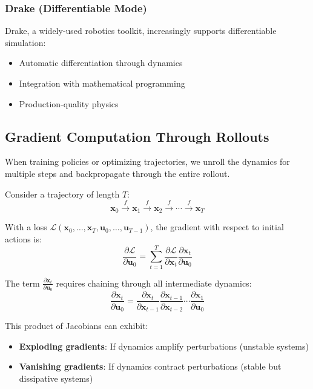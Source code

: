 \subsubsection{Drake (Differentiable Mode)}

Drake, a widely-used robotics toolkit, increasingly supports differentiable simulation:
\begin{itemize}
    \item Automatic differentiation through dynamics
    \item Integration with mathematical programming
    \item Production-quality physics
\end{itemize}

\subsection{Gradient Computation Through Rollouts}

When training policies or optimizing trajectories, we unroll the dynamics for multiple steps and backpropagate through the entire rollout.

Consider a trajectory of length $T$:
\begin{equation}
\mathbf{x}_0 \xrightarrow{f} \mathbf{x}_1 \xrightarrow{f} \mathbf{x}_2 \xrightarrow{f} \cdots \xrightarrow{f} \mathbf{x}_T
\end{equation}

With a loss $\mathcal{L}(\mathbf{x}_0, \ldots, \mathbf{x}_T, \mathbf{u}_0, \ldots, \mathbf{u}_{T-1})$, the gradient with respect to initial actions is:
\begin{equation}
\frac{\partial \mathcal{L}}{\partial \mathbf{u}_0} = \sum_{t=1}^{T} \frac{\partial \mathcal{L}}{\partial \mathbf{x}_t} \frac{\partial \mathbf{x}_t}{\partial \mathbf{u}_0}
\end{equation}

The term $\frac{\partial \mathbf{x}_t}{\partial \mathbf{u}_0}$ requires chaining through all intermediate dynamics:
\begin{equation}
\frac{\partial \mathbf{x}_t}{\partial \mathbf{u}_0} = \frac{\partial \mathbf{x}_t}{\partial \mathbf{x}_{t-1}} \frac{\partial \mathbf{x}_{t-1}}{\partial \mathbf{x}_{t-2}} \cdots \frac{\partial \mathbf{x}_1}{\partial \mathbf{u}_0}
\end{equation}

This product of Jacobians can exhibit:
\begin{itemize}
    \item \textbf{Exploding gradients}: If dynamics amplify perturbations (unstable systems)
    \item \textbf{Vanishing gradients}: If dynamics contract perturbations (stable but dissipative systems)
\end{itemize}

